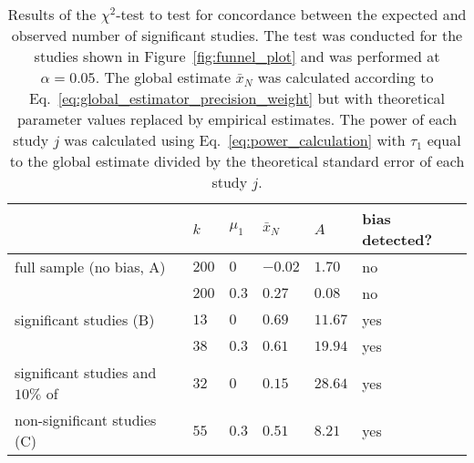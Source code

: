 \begin{table}[h!]
  \begin{center}
    \begin{tabular}{ >{\raggedright\let\\\tabularnewline}p{} | >{\raggedleft\let\\\tabularnewline}p{}| >{\raggedleft\let\\\tabularnewline}p{} | >{\raggedleft\let\\\tabularnewline}p{} | >{\raggedleft\let\\\tabularnewline}p{} | >{\raggedright\let\\\tabularnewline}p{}} 
    \hline
     & $k$\TBstrut & $\mu_1$ & $\bar{x}_N$ & $A$ & bias detected?\\ 
    \hline
    full sample (no bias, A)\Tstrut & $200$ & $0$ & $-0.02$  & $1.70$  & no \\ 
    & $200$\Bstrut & $0.3$ & $0.27$  & $0.08$ & no\\
    \hline
    significant studies (B)\Tstrut& $13$ & $0$ & $0.69$ & $11.67$ & yes \\
    & $38$\Bstrut & $0.3$ & $0.61$ & $19.94$ & yes \\
    \hline
    significant studies and $10\%$ of\Tstrut & $32$ & $0$ & $0.15$ & $28.64$ & yes \\
    non-significant studies (C) & $55$\Bstrut & $0.3$ & $0.51$ & $8.21$ & yes\\
 \hline
\end{tabular}
    \caption[$\chi^2$-test to test for concordance between the expected and observed number of significant studies.]{Results of the $\chi^2$-test to test for concordance between the expected and observed number of significant studies. The test was conducted for the studies shown in Figure~\ref{fig:funnel_plot} and was performed at $\alpha = 0.05$. The global estimate $\bar{x}_N$ was calculated according to Eq.~\ref{eq:global_estimator_precision_weight} but with theoretical parameter values replaced by empirical estimates. The power of each study $j$ was calculated using Eq.~\ref{eq:power_calculation} with $\tau_1$ equal to the global estimate divided by the theoretical standard error of each study $j$.}
    \label{tab:expected_significance}
  \end{center}
\end{table}


